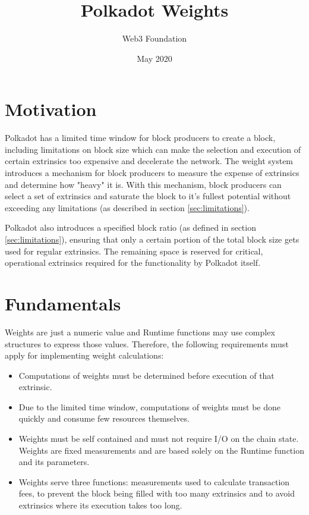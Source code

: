 \documentclass[11pt,a4paper]{article}
\begin{document}
\title{Polkadot Weights}
\author{Web3 Foundation}
\date{May 2020}
\maketitle

\section{Motivation}
Polkadot has a limited time window for block producers to create a block,
including limitations on block size which can make the selection and execution
of certain extrinsics too expensive and decelerate the network. The weight
system introduces a mechanism for block producers to measure the expense of
extrinsics and determine how "heavy" it is. With this mechanism, block producers
can select a set of extrinsics and saturate the block to it's fullest potential
without exceeding any limitations (as described in section \ref{sec:limitations}).
\newline

Polkadot also introduces a specified block ratio (as defined in section \ref{sec:limitations}),
ensuring that only a certain portion of the total block size gets used for regular extrinsics.
The remaining space is reserved for critical, operational extrinsics required for the functionality
by Polkadot itself.

\section{Fundamentals}
Weights are just a numeric value and Runtime functions may use complex structures to express those
values. Therefore, the following requirements must apply for implementing weight calculations:
\begin{itemize}
\item Computations of weights must be determined before execution of that extrinsic.
\item Due to the limited time window, computations of weights must be done quickly and consume
      few resources themselves.
\item Weights must be self contained and must not require I/O on the chain state. Weights are
      fixed measurements and are based solely on the Runtime function and its parameters.
\item Weights serve three functions: measurements used to calculate transaction fees, to prevent
      the block being filled with too many extrinsics and to avoid extrinsics where its execution
      takes too long.
\end{itemize}
\end{document}

